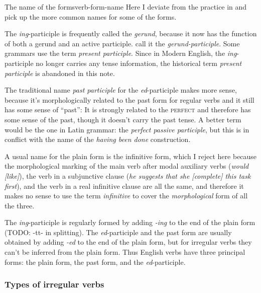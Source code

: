 \documentclass[UTF8, a4paper, oneside, scheme=plain]{ctexrep}
\newcommand*{\citechap}[1]{Ch~{#1}}
\newcommand*{\term}[1]{\emph{#1}}
\newcommand{\corpus}[1]{\emph{#1}}
\newcommand{\category}[1]{\textsc{#1}}
\begin{document}
\begin{infobox}{The name of the forms}{verb-form-name}
    Here I deviate from the practice in \citep[\citechap{3}]{cgel} 
    and pick up the more common names for some of the forms. 

    The \corpus{ing}-participle is frequently called the \term{gerund},
    because it now has the function of both a gerund and an active participle.
    \citet{cgel} call it the \term{gerund-participle}.
    Some grammars use the term \term{present participle}.
    Since in Modern English,
    the \corpus{ing}-participle no longer carries any tense information,
    the historical term \term{present participle} is abandoned in this note.

    The traditional name \term{past participle} for the \corpus{ed}-participle makes more sense,
    because it's morphologically related to the past form for regular verbs 
    and it still has some sense of ``past'':
    It is strongly related to the \category{perfect} and therefore has some sense of the past,
    though it doesn't carry the past tense.
    A better term would be the one in Latin grammar: the \term{perfect passive participle},
    but this is in conflict with the name of the \corpus{having been done} construction.

    A usual name for the plain form is the infinitive form,
    which I reject here because the morphological marking of 
    the main verb after modal auxiliary verbs  
    (\corpus{would [like]}),
    the verb in a subjunctive clause 
    (\corpus{he suggests that she [complete] this task first}),
    and the verb in a real infinitive clause are all the same,
    and therefore it makes no sense to use the term \term{infinitive} 
    to cover the \emph{morphological} form of all the three.
\end{infobox}

The \corpus{ing}-participle is regularly formed by adding \corpus{-ing} to the end of the plain form
(TODO: -tt- in splitting).
The \corpus{ed}-participle and the past form are usually obtained 
by adding \corpus{-ed} to the end of the plain form,
but for irregular verbs they can't be inferred from the plain form.
Thus English verbs have three principal forms:
the plain form, the past form, and the \corpus{ed}-participle.

\subsubsection{Types of irregular verbs}
\end{document}

